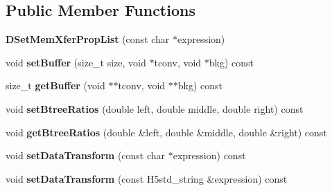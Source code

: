 \subsection*{Public Member Functions}
\begin{DoxyCompactItemize}
\item 
\mbox{\label{class_h5_1_1_d_set_mem_xfer_prop_list_a8897297eb9f27e86bc4f96a3166ea1ee}} 
{\bfseries D\+Set\+Mem\+Xfer\+Prop\+List} (const char $\ast$expression)
\item 
\mbox{\label{class_h5_1_1_d_set_mem_xfer_prop_list_ac1b61395b8937b6bd2981147dd2e3a8b}} 
void {\bfseries set\+Buffer} (size\+\_\+t size, void $\ast$tconv, void $\ast$bkg) const
\item 
\mbox{\label{class_h5_1_1_d_set_mem_xfer_prop_list_a165e758e6ae9e34865d694d20610d488}} 
size\+\_\+t {\bfseries get\+Buffer} (void $\ast$$\ast$tconv, void $\ast$$\ast$bkg) const
\item 
\mbox{\label{class_h5_1_1_d_set_mem_xfer_prop_list_ad25f91bdfb0d056253449274c3c0800a}} 
void {\bfseries set\+Btree\+Ratios} (double left, double middle, double right) const
\item 
\mbox{\label{class_h5_1_1_d_set_mem_xfer_prop_list_ab26ffa9724e7931ffb2a2ef659663b12}} 
void {\bfseries get\+Btree\+Ratios} (double \&left, double \&middle, double \&right) const
\item 
\mbox{\label{class_h5_1_1_d_set_mem_xfer_prop_list_ae095757e0524eb3b9cd43f280d56a746}} 
void {\bfseries set\+Data\+Transform} (const char $\ast$expression) const
\item 
\mbox{\label{class_h5_1_1_d_set_mem_xfer_prop_list_a61887e3190b6c1b2b683e1189cd4ce20}} 
void {\bfseries set\+Data\+Transform} (const H5std\+\_\+string \&expression) const
\item 
\mbox{\label{class_h5_1_1_d_set_mem_xfer_prop_list_a68afe419b2f13dd77f4fa6da1f2a0cee}} 

\end{DoxyCompactItemize}

